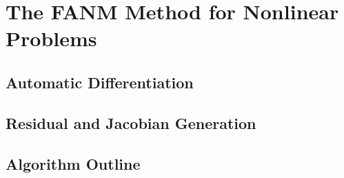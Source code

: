 \chapter{The FANM Method for Nonlinear Problems}
\label{ch:fanm}

\section{Automatic Differentiation}
\label{sec:automatic_differentiation}

\section{Residual and Jacobian Generation}
\label{sec:fanm_generation}

\section{Algorithm Outline}
\label{sec:algorithm_outline}
